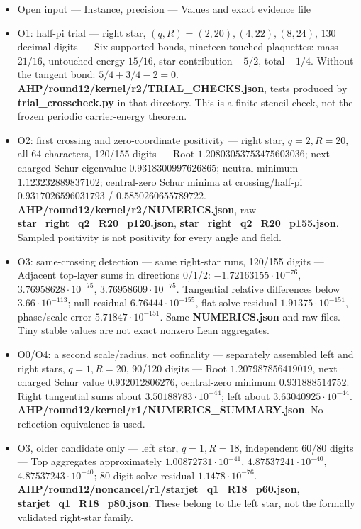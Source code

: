 \begin{itemize}
\item  Open input  ---  Instance, precision  ---  Values and exact evidence file 
\item  O1: half-pi trial  ---  right star, \((q,R)=(2,20),(4,22),(8,24)\), 130 decimal digits  ---  Six supported bonds, nineteen touched plaquettes: mass \(21/16\), untouched energy \(15/16\), star contribution \(-5/2\), total \(-1/4\). Without the tangent bond: \(5/4+3/4-2=0\). \textbf{AHP/round12/kernel/r2/TRIAL\_CHECKS.json}, tests produced by \textbf{trial\_crosscheck.py} in that directory. This is a finite stencil check, not the frozen periodic carrier-energy theorem. 
\item  O2: first crossing and zero-coordinate positivity  ---  right star, \(q=2,R=20\), all 64 characters, 120/155 digits  ---  Root \(1.20803053753475603036\); next charged Schur eigenvalue \(0.9318300997626865\); neutral minimum \(1.123232889837102\); central-zero Schur minima at crossing/half-pi \(0.9317026596031793\) / \(0.5850260655789722\). \textbf{AHP/round12/kernel/r2/NUMERICS.json}, raw \textbf{star\_right\_q2\_R20\_p120.json}, \textbf{star\_right\_q2\_R20\_p155.json}. Sampled positivity is not positivity for every angle and field. 
\item  O3: same-crossing detection  ---  same right-star runs, 120/155 digits  ---  Adjacent top-layer sums in directions 0/1/2: \(-1.72163155\cdot10^{-76}\), \(3.76958628\cdot10^{-75}\), \(3.76958609\cdot10^{-75}\). Tangential relative differences below \(3.66\cdot10^{-113}\); null residual \(6.76444\cdot10^{-155}\), flat-solve residual \(1.91375\cdot10^{-151}\), phase/scale error \(5.71847\cdot10^{-151}\). Same \textbf{NUMERICS.json} and raw files. Tiny stable values are not exact nonzero Lean aggregates. 
\item  O0/O4: a second scale/radius, not cofinality  ---  separately assembled left and right stars, \(q=1,R=20\), 90/120 digits  ---  Root \(1.207987856419019\), next charged Schur value \(0.932012806276\), central-zero minimum \(0.931888514752\). Right tangential sums about \(3.50188783\cdot10^{-44}\); left about \(3.63040925\cdot10^{-44}\). \textbf{AHP/round12/kernel/r1/NUMERICS\_SUMMARY.json}. No reflection equivalence is used. 
\item  O3, older candidate only  ---  left star, \(q=1,R=18\), independent 60/80 digits  ---  Top aggregates approximately \(1.00872731\cdot10^{-41}\), \(4.87537241\cdot10^{-40}\), \(4.87537243\cdot10^{-40}\); 80-digit solve residual \(1.1478\cdot10^{-76}\). \textbf{AHP/round12/noncancel/r1/starjet\_q1\_R18\_p60.json}, \textbf{starjet\_q1\_R18\_p80.json}. These belong to the left star, not the formally validated right-star family. 

\end{itemize}

